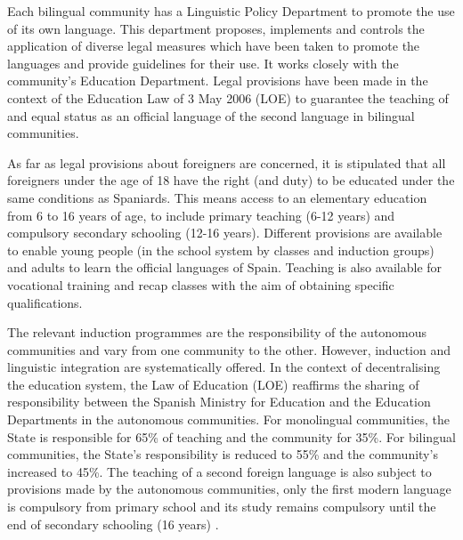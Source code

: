 \begin{multicols}{2}
Each bilingual community has a Linguistic Policy Department to promote the use of its own language. This department proposes, implements and controls the application of diverse legal measures which have been taken to promote the languages and provide guidelines for their use. It works closely with the community’s Education Department. Legal provisions have been made in the context of the Education Law of 3 May 2006 (LOE) to guarantee the teaching of and equal status as an official language of the second language in bilingual communities.


As far as legal provisions about foreigners are concerned, it is stipulated that all foreigners under the age of 18 have the right (and duty) to be educated under the same conditions as Spaniards. This means access to an elementary education from 6 to 16 years of age, to include primary teaching (6-12 years) and compulsory secondary schooling (12-16 years). Different provisions are available to enable young people (in the school system by classes and induction groups) and adults to learn the official languages of Spain. Teaching is also available for vocational training and recap classes with the aim of obtaining specific qualifications.

 
The relevant induction programmes are the responsibility of the autonomous communities and vary from one community to the other. However, induction and linguistic integration are systematically offered. 
In the context of decentralising the education system, the Law of Education (LOE) reaffirms the sharing of responsibility between the Spanish Ministry for Education and the Education Departments in the autonomous communities. For monolingual communities, the State is responsible for 65\% of teaching and the community for 35\%. For bilingual communities, the State’s responsibility is reduced to 55\% and the community’s increased to 45\%. The teaching of a second foreign language is also subject to provisions made by the autonomous communities, only the first modern language is compulsory from primary school and its study remains compulsory until the end of secondary schooling (16 years) \cite{Efni1}.


\end{multicols}

